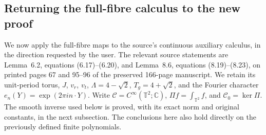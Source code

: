 \subsection{Returning the full-fibre calculus to the new proof}
\label{sec:ns-reverse-proof}

We now apply the full-fibre maps to the source's continuous auxiliary
calculus, in the direction requested by the user. The relevant source
statements are Lemma~6.2, equations (6.17)--(6.20), and Lemma~8.6,
equations (8.19)--(8.23), on printed pages 67 and 95--96 of the
preserved 166-page manuscript. We retain its unit-period torus,
$J$, $v_r$, $v_t$, $\Lambda=4-\sqrt2$, $T_g=4+\sqrt2$,
and the Fourier character $e_n(Y)=\exp(2\pi i n\cdot Y)$.
Write $\mathscr C=C^\infty(\mathbb T^2;\mathbb C)$,
$\Pi f=\int_{\mathbb T^2}f$, and $\mathscr C_0=\ker\Pi$.
The smooth inverse used below is proved, with its exact norm and
original constants, in the next subsection. The conclusions here
also hold directly on the previously defined finite polynomials.

